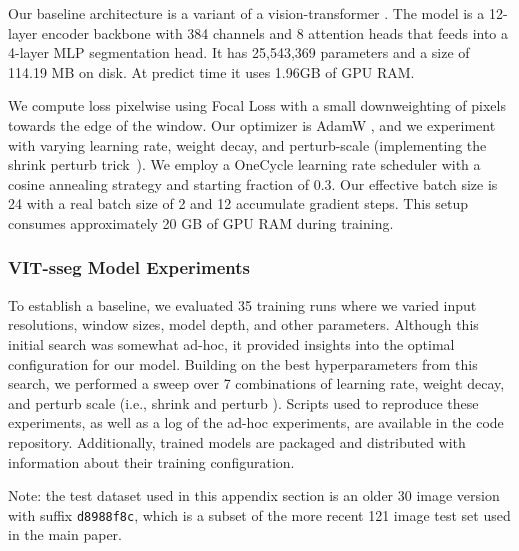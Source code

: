 Our baseline architecture is a variant \cite{bertasius2021space,Greenwell_2024_WACV} of a vision-transformer
  \cite{dosovitskiy_image_2021}.
The model is a 12-layer encoder backbone with 384 channels and 8 attention heads that feeds into a 4-layer
  MLP segmentation head.
It has 25,543,369 parameters and a size of 114.19 MB on disk.
At predict time it uses 1.96GB of GPU RAM.

We compute loss pixelwise using Focal Loss \cite{ross2017focal} with a small downweighting of pixels towards
  the edge of the window.
Our optimizer is AdamW \cite{loshchilov_decoupled_2018}, and we experiment with varying learning rate,
  weight decay, and perturb-scale (implementing the shrink perturb trick~\cite{ash_warm_starting_2020,dohare_loss_2023}).
We employ a OneCycle learning rate scheduler \cite{smith2019super} with a cosine annealing strategy and
  starting fraction of 0.3.
Our effective batch size is 24 with a real batch size of 2 and 12 accumulate gradient steps.
This setup consumes approximately 20 GB of GPU RAM during training.

\subsubsection{VIT-sseg Model Experiments}

To establish a baseline, we evaluated 35 training runs where we varied input resolutions, window sizes,
  model depth, and other parameters.
Although this initial search was somewhat ad-hoc, it provided insights into the optimal configuration for
  our model.
Building on the best hyperparameters from this search, we performed a sweep over 7 combinations of learning
  rate, weight decay, and perturb scale (i.e., shrink and perturb
  \cite{ash_warm_starting_2020,dohare_loss_2023}).
Scripts used to reproduce these experiments, as well as a log of the ad-hoc experiments, are available in
  the code repository.
Additionally, trained models are packaged and distributed with information about their training
  configuration.

Note:
the test dataset used in this appendix section is an older 30 image version with suffix {\tt d8988f8c},
  which is a subset of the more recent 121 image test set used in the main paper.


